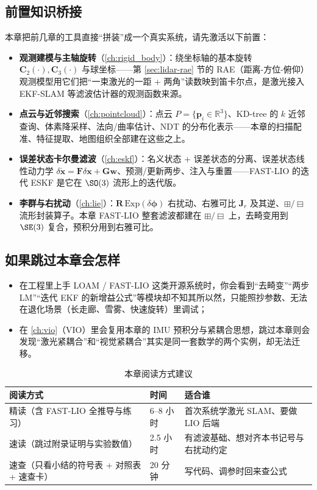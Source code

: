 \subsection*{前置知识桥接}
本章把前几章的工具直接“拼装”成一个真实系统，请先激活以下前置：
\begin{itemize}
  \item \textbf{观测建模与主轴旋转}（\cref{ch:rigid_body}）：绕坐标轴的基本旋转 $\mathbf{C}_2(\cdot),\mathbf{C}_3(\cdot)$ 与球坐标——第 \ref{sec:lidar-rae} 节的 RAE（距离-方位-俯仰）观测模型用它们把“一束激光的一距 + 两角”读数映到笛卡尔点，是激光接入 EKF-SLAM 等滤波估计器的观测函数来源。
  \item \textbf{点云与近邻搜索}（\cref{ch:pointcloud}）：点云 $P=\{\mathbf{p}_i\in\mathbb{R}^3\}$、KD-tree 的 $k$ 近邻查询、体素降采样、法向/曲率估计、NDT 的分布化表示——本章的扫描配准、特征提取、地图组织全部建在这些之上。
  \item \textbf{误差状态卡尔曼滤波}（\cref{ch:eskf}）：名义状态 + 误差状态的分离、误差状态线性动力学 $\delta\dot{\mathbf{x}}=\mathbf{F}\delta\mathbf{x}+\mathbf{G}\mathbf{w}$、预测/更新两步、注入与重置——FAST-LIO 的迭代 ESKF 是它在 $\SO(3)$ 流形上的迭代版。
  \item \textbf{李群与右扰动}（\cref{ch:lie}）：$\mathbf{R}\,\mathrm{Exp}(\delta\boldsymbol{\phi})$ 右扰动、右雅可比 $\mathbf{J}_r$ 及其逆、$\boxplus/\boxminus$ 流形封装算子。本章 FAST-LIO 整套滤波都建在 $\boxplus/\boxminus$ 上，去畸变用到 $\SE(3)$ 复合，预积分用到右雅可比。
\end{itemize}

\subsection*{如果跳过本章会怎样}
\begin{itemize}
  \item 在工程里上手 LOAM / FAST-LIO 这类开源系统时，你会看到“去畸变”“两步 LM”“迭代 EKF 的新增益公式”等模块却不知其所以然，只能照抄参数、无法在退化场景（长走廊、雪雾、快速旋转）里调试；
  \item 在 \cref{ch:vio}（VIO）里会复用本章的 IMU 预积分与紧耦合思想，跳过本章则会发现“激光紧耦合”和“视觉紧耦合”其实是同一套数学的两个实例，却无法迁移。
\end{itemize}

\begin{table}[H]\centering\small
\caption{本章阅读方式建议}
\label{tab:lidar-reading}
\begin{tabular}{lll}
\toprule
阅读方式 & 时间 & 适合谁 \\
\midrule
精读（含 FAST-LIO 全推导与练习） & 6--8 小时 & 首次系统学激光 SLAM、要做 LIO 后端 \\
速读（跳过附录证明与实验数值） & 2.5 小时 & 有滤波基础、想对齐本书记号与右扰动约定 \\
速查（只看小结的符号表 + 对照表 + 速查卡） & 20 分钟 & 写代码、调参时回来查公式 \\
\bottomrule
\end{tabular}
\end{table}

